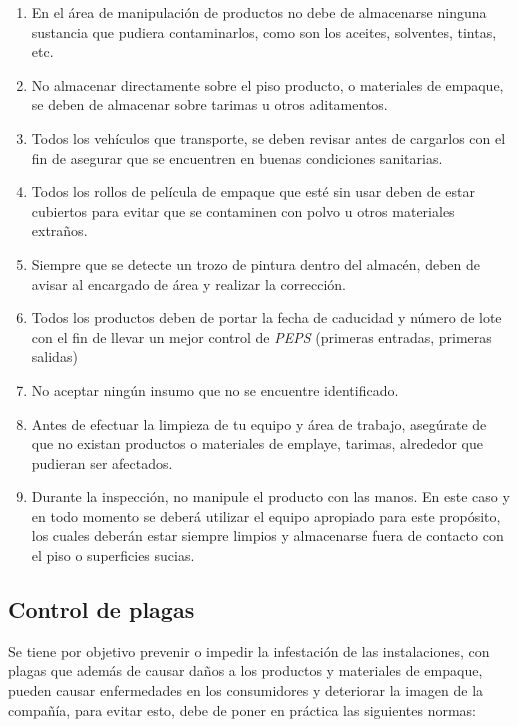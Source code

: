\begin{enumerate}
	\item En el área de manipulación de productos no debe de almacenarse ninguna sustancia que pudiera contaminarlos, como son los aceites, solventes, tintas, etc.
	\item No almacenar directamente sobre el piso producto, o materiales de empaque, se deben de almacenar sobre tarimas u otros aditamentos.
	\item Todos los vehículos que transporte, se deben revisar antes de cargarlos con el fin de asegurar que se encuentren en buenas condiciones sanitarias.
	\item Todos los rollos de película de empaque que esté sin usar deben de estar cubiertos para evitar que se contaminen con polvo u otros materiales extraños.
	\item Siempre que se detecte un trozo de pintura dentro del almacén, deben de avisar al encargado de área y realizar la corrección.
	\item Todos los productos deben de portar la fecha de caducidad y número de lote con el fin de llevar un mejor control de \textit{PEPS} (primeras entradas, primeras salidas)
	\item No aceptar ningún insumo que no se encuentre identificado.
	\item Antes de efectuar la limpieza de tu equipo y área de trabajo, asegúrate de que no existan productos o materiales de emplaye, tarimas, alrededor que pudieran ser afectados.
	\item Durante la inspección, no manipule el producto con las manos. En este caso y en todo momento se deberá utilizar el equipo apropiado para este propósito, los cuales deberán estar siempre limpios y almacenarse fuera de contacto con el piso o superficies sucias.
\end{enumerate}

\subsection{Control de plagas}
Se tiene por objetivo prevenir o impedir la infestación de las instalaciones, con plagas que además de causar daños a los productos y materiales de empaque, pueden causar enfermedades en los consumidores y deteriorar la imagen de la compañía, para evitar esto, debe de poner en práctica las siguientes normas:

